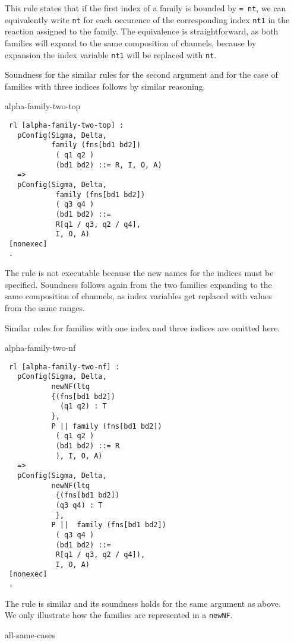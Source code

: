 \documentclass{article}
\begin{document}
\begin{itemize}
This rule states that if the first index of a family is bounded by
\texttt{= nt}, we can equivalently write \texttt{nt} for each
occurence of the corresponding index \texttt{nt1} in the reaction
assigned to the family. The equivalence is straightforward, as both families 
will expand to the same composition of channels, because by expansion
the index variable \texttt{nt1} will be replaced with \texttt{nt}.

Soundness for the similar rules for the second argument and for the case of 
families with three indices follows by similar reasoning.

\item[alpha-family-two-top]
\begin{lstlisting}
 rl [alpha-family-two-top] : 
   pConfig(Sigma, Delta, 
           family (fns[bd1 bd2]) 
            ( q1 q2 ) 
            (bd1 bd2) ::= R, I, O, A)
   => 
   pConfig(Sigma, Delta,
            family (fns[bd1 bd2]) 
            ( q3 q4 ) 
            (bd1 bd2) ::= 
            R[q1 / q3, q2 / q4],
            I, O, A)
 [nonexec]
 .
\end{lstlisting}

The rule is not executable because the new names for the indices must be
specified. Soundness follows again from the two families expanding to the
same composition of channels, as index variables get replaced with values
from the same ranges.

Similar rules for families with one index and three indices are 
omitted here.

\item[alpha-family-two-nf]
\begin{lstlisting}
 rl [alpha-family-two-nf] : 
   pConfig(Sigma, Delta, 
           newNF(ltq 
           {(fns[bd1 bd2]) 
             (q1 q2) : T
           },  
           P || family (fns[bd1 bd2]) 
            ( q1 q2 ) 
            (bd1 bd2) ::= R
            ), I, O, A)
   => 
   pConfig(Sigma, Delta,
           newNF(ltq 
            {(fns[bd1 bd2]) 
            (q3 q4) : T
            },  
           P ||  family (fns[bd1 bd2]) 
            ( q3 q4 ) 
            (bd1 bd2) ::= 
            R[q1 / q3, q2 / q4]),
            I, O, A)
 [nonexec]
 .
\end{lstlisting}

The rule is similar and its soundness holds for the same argument as above. 
We only illustrate how the families are represented in a 
\texttt{newNF}.

\item[all-same-cases]


\end{itemize}
\end{document}
